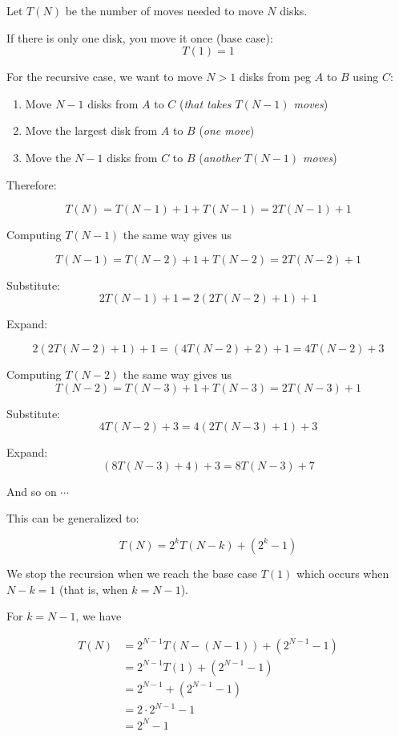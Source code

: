 \newpage
\begin{excursion}{}
Let $T(N)$ be the number of moves needed to move $N$ disks. 

If there is only one disk, you move it once (base case):
\[
T(1) = 1
\]

For the recursive case, we want to move $N>1$ disks from peg $A$ to $B$ using $C$:
\begin{enumerate}
    \item Move $N-1$ disks from $A$ to $C$ (\textit{that takes $T(N-1)$ moves})
    \item Move the largest disk from $A$ to $B$ (\textit{one move})
    \item Move the $N-1$ disks from $C$ to $B$ (\textit{another $T(N-1)$ moves})
\end{enumerate}

Therefore:

\[
T(N) = T(N-1) + 1 + T(N-1) = 2T(N-1)+1
\]


Computing $T(N-1)$ the same way gives us 

\[
T(N-1) = T(N-2) + 1 + T(N-2) = 2T(N-2)+1
\]

Substitute:
\[
2T(N-1)+1 = 2(2T(N-2)+1)+1
\]


Expand:

\[
2(2T(N-2)+1)+1 = (4T(N-2) + 2) + 1 = 4T(N-2) + 3
\]

Computing $T(N-2)$ the same way gives us 
\[
T(N-2) = T(N-3) + 1 + T(N-3) = 2T(N-3)+1
\]


Substitute:
\[
4T(N-2) + 3 = 4(2T(N-3)+1) + 3
\]

Expand:
\[
(8T(N-3) + 4) + 3 = 8T(N-3) + 7
\]

And so on $\cdots$




This can be generalized to:

\[
T(N) = 2^k T(N-k) + (2^k - 1)
\]


We stop the recursion when we reach the base case $T(1)$ which occurs when $N-k = 1$ (that is, when $k=N-1$).


For $k = N-1$, we have

\begin{align*}
T(N) &= 2^{N-1} T(N - (N - 1)) + (2^{N-1} - 1) \\
     &= 2^{N-1} T(1) + (2^{N-1} - 1) \\
     &= 2^{N-1} + (2^{N-1} - 1) \\
     &= 2 \cdot 2^{N-1} - 1 \\
     &= 2^N - 1
\end{align*}
\end{excursion}
